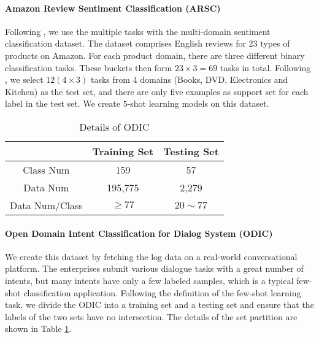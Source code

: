 \documentclass[11pt,a4paper]{article}
\begin{document}
\paragraph{Amazon Review Sentiment Classification (ARSC)} Following \citet{yu2018diverse}, we use the multiple tasks with the multi-domain sentiment classification \citep{blitzer2007biographies} dataset. The dataset comprises English reviews for 23 types of products on Amazon. For each product domain, there are three different binary classification tasks. These buckets then form $23\times3=69$ tasks in total. Following \citet{yu2018diverse}, we select $12(4\times3)$ tasks from 4 domains (Books, DVD, Electronics and Kitchen) as the test set, and there are only five examples as support set for each label in the test set. We create $5$-shot learning models on this dataset. 
\begin{table} [t]
\centering
\small
\begin{tabular}{ccc}  
\toprule
 & \textbf{Training Set} & \textbf{Testing Set}\\ 
\midrule
Class Num& 159 & 57\\ 
Data Num & 195,775 & 2,279\\ 
Data Num/Class & $\ge 77$  & $20 \sim 77$\\ 
\bottomrule
\end{tabular}  
\caption{Details of ODIC}    
\label{table_odic}
\end{table}  

\paragraph{Open Domain Intent Classification for Dialog System (ODIC)} We create this dataset by fetching the log data on a real-world conversational platform. The enterprises submit various dialogue tasks with a great number of intents, but many intents have only a few labeled samples, which is a typical few-shot classification application. Following the definition of the few-shot learning task, we divide the ODIC into a training set and a testing set and ensure that the labels of the two sets have no intersection. The details of the set partition are shown in Table \ref{table_odic}.
\end{document}
